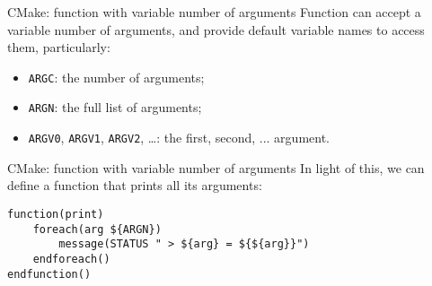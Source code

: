 \begin{frame}[fragile]{CMake: function with variable number of arguments}
    Function can accept a variable number of arguments, and provide default variable names to access them, particularly:
    \begin{itemize}
        \item \texttt{ARGC}: the number of arguments;
        \item \texttt{ARGN}: the full list of arguments;
        \item \texttt{ARGV0}, \texttt{ARGV1}, \texttt{ARGV2}, \ldots: the first, second, ... argument.
    \end{itemize}
\end{frame}

\begin{frame}[fragile]{CMake: function with variable number of arguments}
    In light of this, we can define a function that prints all its arguments:
    \begin{lstlisting}
function(print)
    foreach(arg ${ARGN})
        message(STATUS " > ${arg} = ${${arg}}")
    endforeach()
endfunction()
\end{lstlisting}
\end{frame}
